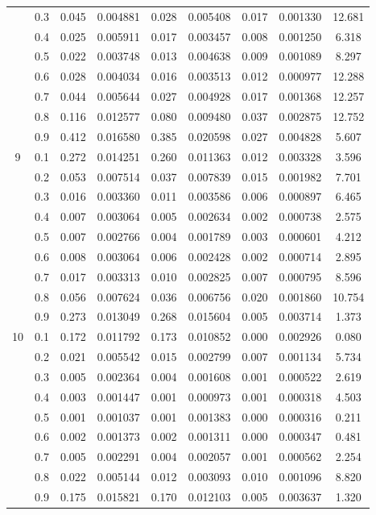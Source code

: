 \begin{longtable}{ | c | c || c | c | c | c | c | c | c | }
 & 0.3 & 0.045 & 0.004881 & 0.028 & 0.005408 & 0.017 & 0.001330 & 12.681 \\
 & 0.4 & 0.025 & 0.005911 & 0.017 & 0.003457 & 0.008 & 0.001250 & 6.318 \\
 & 0.5 & 0.022 & 0.003748 & 0.013 & 0.004638 & 0.009 & 0.001089 & 8.297 \\
 & 0.6 & 0.028 & 0.004034 & 0.016 & 0.003513 & 0.012 & 0.000977 & 12.288 \\
 & 0.7 & 0.044 & 0.005644 & 0.027 & 0.004928 & 0.017 & 0.001368 & 12.257 \\
 & 0.8 & 0.116 & 0.012577 & 0.080 & 0.009480 & 0.037 & 0.002875 & 12.752 \\
 & 0.9 & 0.412 & 0.016580 & 0.385 & 0.020598 & 0.027 & 0.004828 & 5.607 \\
 \hline
\multirow{9}{*}{9} & 0.1 & 0.272 & 0.014251 & 0.260 & 0.011363 & 0.012 & 0.003328 & 3.596 \\
 & 0.2 & 0.053 & 0.007514 & 0.037 & 0.007839 & 0.015 & 0.001982 & 7.701 \\
 & 0.3 & 0.016 & 0.003360 & 0.011 & 0.003586 & 0.006 & 0.000897 & 6.465 \\
 & 0.4 & 0.007 & 0.003064 & 0.005 & 0.002634 & 0.002 & 0.000738 & 2.575 \\
 & 0.5 & 0.007 & 0.002766 & 0.004 & 0.001789 & 0.003 & 0.000601 & 4.212 \\
 & 0.6 & 0.008 & 0.003064 & 0.006 & 0.002428 & 0.002 & 0.000714 & 2.895 \\
 & 0.7 & 0.017 & 0.003313 & 0.010 & 0.002825 & 0.007 & 0.000795 & 8.596 \\
 & 0.8 & 0.056 & 0.007624 & 0.036 & 0.006756 & 0.020 & 0.001860 & 10.754 \\
 & 0.9 & 0.273 & 0.013049 & 0.268 & 0.015604 & 0.005 & 0.003714 & 1.373 \\
 \hline
\multirow{9}{*}{10} & 0.1 & 0.172 & 0.011792 & 0.173 & 0.010852 & 0.000 & 0.002926 & 0.080 \\
 & 0.2 & 0.021 & 0.005542 & 0.015 & 0.002799 & 0.007 & 0.001134 & 5.734 \\
 & 0.3 & 0.005 & 0.002364 & 0.004 & 0.001608 & 0.001 & 0.000522 & 2.619 \\
 & 0.4 & 0.003 & 0.001447 & 0.001 & 0.000973 & 0.001 & 0.000318 & 4.503 \\
 & 0.5 & 0.001 & 0.001037 & 0.001 & 0.001383 & 0.000 & 0.000316 & 0.211 \\
 & 0.6 & 0.002 & 0.001373 & 0.002 & 0.001311 & 0.000 & 0.000347 & 0.481 \\
 & 0.7 & 0.005 & 0.002291 & 0.004 & 0.002057 & 0.001 & 0.000562 & 2.254 \\
 & 0.8 & 0.022 & 0.005144 & 0.012 & 0.003093 & 0.010 & 0.001096 & 8.820 \\
 & 0.9 & 0.175 & 0.015821 & 0.170 & 0.012103 & 0.005 & 0.003637 & 1.320 \\
 \hline
\hline
\end{longtable}
 
